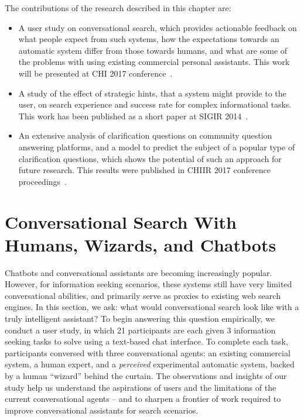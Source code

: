 The contributions of the research described in this chapter are:
\begin{itemize}
\item A user study on conversational search, which provides actionable feedback on what people expect from such systems, how the expectations towards an automatic system differ from those towards humans, and what are some of the problems with using existing commercial personal assistants.
This work will be presented at CHI 2017 conference~\cite{vtyurina2017convsearch}.
\item A study of the effect of strategic hints, that a system might provide to the user, on search experience and success rate for complex informational tasks.
This work has been published as a short paper at SIGIR 2014~\cite{savenkov2014hint}.
\item An extensive analysis of clarification questions on community question answering platforms, and a model to predict the subject of a popular type of clarification questions, which shows the potential of such an approach for future research.
This results were published in CHIIR 2017 conference proceedings~\cite{braslavski2017clarq}.
\end{itemize}

\section{Conversational Search With Humans, Wizards, and Chatbots}
\label{section:conversation:user-study}

Chatbots and conversational assistants are becoming increasingly popular.
However, for information seeking scenarios, these systems still have very limited conversational abilities, and primarily serve as proxies to existing web search engines.
In this section, we ask: what would conversational search look like with a truly intelligent assistant?
To begin answering this question empirically, we conduct a user study, in which 21 participants are each given 3 information seeking tasks to solve using a text-based chat interface.
To complete each task, participants conversed with three conversational agents: an existing commercial system, a human expert, and a \textit{perceived} experimental automatic system, backed by a human ``wizard'' behind the curtain.
The observations and insights of our study help us understand the aspirations of users and the limitations of the current conversational agents -- and to sharpen a frontier of work required to improve conversational assistants for search scenarios.

